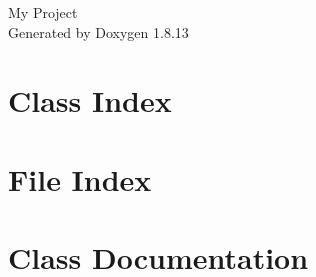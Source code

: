 \documentclass[twoside]{book}
\newcommand{\+}{\discretionary{\mbox{\scriptsize$\hookleftarrow$}}{}{}}
\newcommand{\clearemptydoublepage}{%
  \newpage{\pagestyle{empty}\cleardoublepage}%
}
\begin{document}
\hypersetup{pageanchor=false,
             bookmarksnumbered=true,
             pdfencoding=unicode
            }
\begin{titlepage}
\vspace*{7cm}
\begin{center}%
{\Large My Project }\\
\vspace*{1cm}
{\large Generated by Doxygen 1.8.13}\\
\end{center}
\end{titlepage}
\clearemptydoublepage
{}
\tableofcontents
\clearemptydoublepage
{}
\hypersetup{pageanchor=true}

\chapter{Class Index}

\chapter{File Index}

\chapter{Class Documentation}



















\end{document}

